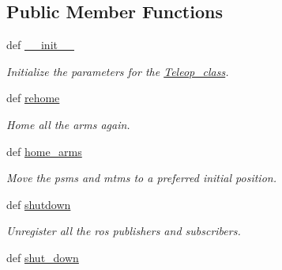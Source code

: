\subsection*{Public Member Functions}
\begin{DoxyCompactItemize}
\item 
def \hyperlink{classcamera__control__node_1_1Teleop__class_a9c0c5b407b294c85fe58fe045c6c0bbc}{\-\_\-\-\_\-init\-\_\-\-\_\-}
\begin{DoxyCompactList}\small\item\em Initialize the parameters for the \hyperlink{classcamera__control__node_1_1Teleop__class}{Teleop\-\_\-class}. \end{DoxyCompactList}\item 
\hypertarget{classcamera__control__node_1_1Teleop__class_ac76b2e93af302ff7af61f6d646445084}{def \hyperlink{classcamera__control__node_1_1Teleop__class_ac76b2e93af302ff7af61f6d646445084}{rehome}}\label{classcamera__control__node_1_1Teleop__class_ac76b2e93af302ff7af61f6d646445084}

\begin{DoxyCompactList}\small\item\em Home all the arms again. \end{DoxyCompactList}\item 
\hypertarget{classcamera__control__node_1_1Teleop__class_abdfa09c4d553ccf3ddf9dab8ff2a789d}{def \hyperlink{classcamera__control__node_1_1Teleop__class_abdfa09c4d553ccf3ddf9dab8ff2a789d}{home\-\_\-arms}}\label{classcamera__control__node_1_1Teleop__class_abdfa09c4d553ccf3ddf9dab8ff2a789d}

\begin{DoxyCompactList}\small\item\em Move the psms and mtms to a preferred initial position. \end{DoxyCompactList}\item 
\hypertarget{classcamera__control__node_1_1Teleop__class_a4efbf44a090e93896242a8d73bed80c2}{def \hyperlink{classcamera__control__node_1_1Teleop__class_a4efbf44a090e93896242a8d73bed80c2}{shutdown}}\label{classcamera__control__node_1_1Teleop__class_a4efbf44a090e93896242a8d73bed80c2}

\begin{DoxyCompactList}\small\item\em Unregister all the ros publishers and subscribers. \end{DoxyCompactList}\item 
\hypertarget{classcamera__control__node_1_1Teleop__class_a9486ebc1dd621f3ed3aa32120d671b8e}{def \hyperlink{classcamera__control__node_1_1Teleop__class_a9486ebc1dd621f3ed3aa32120d671b8e}{shut\-\_\-down}}\label{classcamera__control__node_1_1Teleop__class_a9486ebc1dd621f3ed3aa32120d671b8e}


\end{DoxyCompactItemize}
